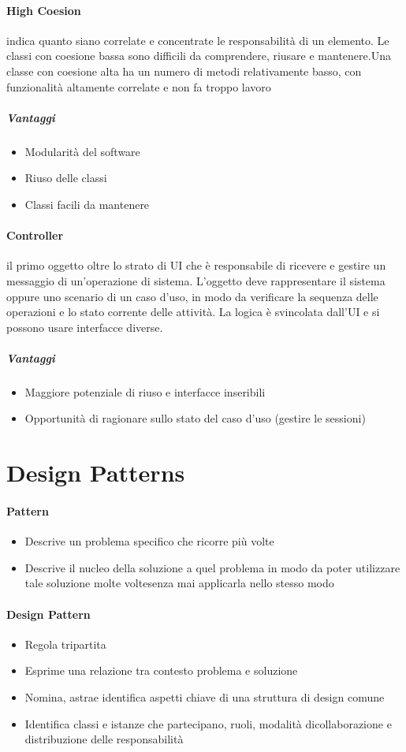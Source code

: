 \documentclass[12pt]{article}
\begin{document}
\paragraph{High Coesion} indica quanto siano correlate e concentrate le responsabilità di un elemento. Le classi con coesione bassa sono difficili da comprendere, riusare e mantenere.Una classe con coesione alta ha un numero di metodi relativamente basso, con funzionalità altamente correlate e non fa troppo lavoro
\subparagraph{Vantaggi}
\begin{itemize}
    \item Modularità del software
    \item Riuso delle classi
    \item Classi facili da mantenere
\end{itemize}
\newpage
\paragraph{Controller} il primo oggetto oltre lo strato di UI che è responsabile di ricevere e gestire un messaggio di un’operazione di sistema. L’oggetto deve rappresentare il sistema oppure uno scenario di un caso d’uso, in modo da verificare la sequenza delle operazioni e lo stato corrente delle attività. La logica è svincolata dall’UI e si possono usare interfacce diverse.
\subparagraph{Vantaggi}
\begin{itemize}
    \item Maggiore potenziale di riuso e interfacce inseribili
    \item Opportunità di ragionare sullo stato del caso d'uso (gestire le sessioni)
\end{itemize}
\newpage
\section{Design Patterns}
\paragraph{Pattern}
\begin{itemize}
    \item Descrive un problema specifico che ricorre più volte
    \item Descrive il nucleo della soluzione a quel problema in modo da poter utilizzare tale soluzione molte voltesenza mai applicarla nello stesso modo
\end{itemize}
\paragraph{Design Pattern}
\begin{itemize}
    \item Regola tripartita
    \item Esprime una relazione tra contesto problema e soluzione
    \item Nomina, astrae identifica aspetti chiave di una struttura di design comune
    \item Identifica classi e istanze che partecipano, ruoli, modalità dicollaborazione e distribuzione delle responsabilità
\end{itemize}
\end{document}
